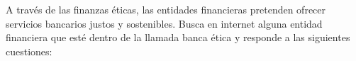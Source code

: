 
%
%
%



\clearpage
{}
\fsection{\boldit{\textcolor{waveBlue2}{Utiliza las tic.}}} 

A través de las finanzas éticas, las entidades financieras pretenden ofrecer servicios bancarios 
justos y sostenibles. Busca en internet alguna entidad financiera que esté dentro de la llamada banca 
ética y responde a las siguientes cuestiones:

